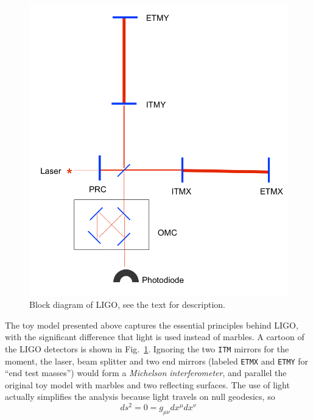 \begin{figure}
  \includegraphics[width=\linewidth]{figures/detectors/LIGO}
  \caption[Block diagram of LIGO]{
  \label{f:ligo}
Block diagram of LIGO, see the text for description.
}
\end{figure}%

The toy model presented above captures the essential principles behind
LIGO, with the significant difference that light is used instead of
marbles.  A cartoon of the LIGO detectors is shown in
Fig.~\ref{f:ligo}.  Ignoring the two \texttt{ITM} mirrors for the
moment, the laser, beam splitter and two end mirrors (labeled
\texttt{ETMX} and \texttt{ETMY} for ``end test masses'') would form a
\emph{Michelson interferometer}, and parallel the original toy model
with marbles and two reflecting surfaces.  The use of light
actually simplifies the analysis because light travels on null
geodesics, so
%
\begin{equation*} ds^2 = 0 = g_{\mu\nu} dx^\mu dx^\nu \end{equation*}

